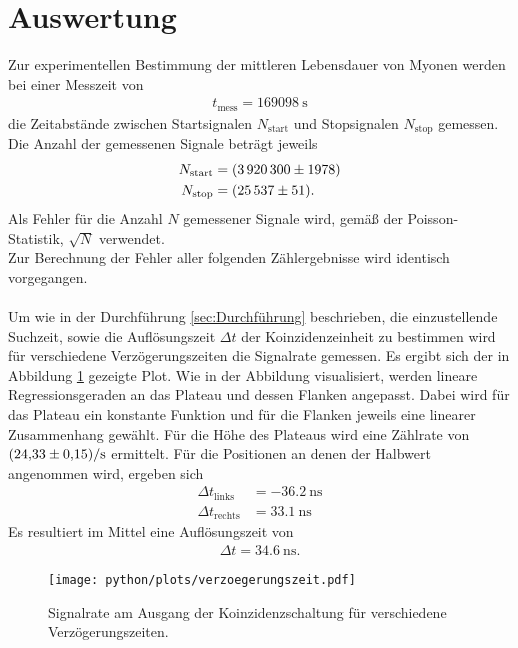 \section{Auswertung}
\label{sec:Auswertung}
Zur experimentellen Bestimmung der mittleren Lebensdauer von Myonen
werden bei einer Messzeit von
\begin{align*}
  t_\text{mess} = \SI{169098}{\second}
\end{align*}
die Zeitabstände zwischen Startsignalen $N_\text{start}$ und
Stopsignalen $N_\text{stop}$ gemessen.
Die Anzahl der gemessenen Signale beträgt jeweils
\begin{align*}
  N_\text{start} &= \SI{3920300+-1978}{}\\
  N_\text{stop} &= \SI{25537+-51}{} .
\end{align*}
Als Fehler für die Anzahl $N$ gemessener Signale wird, gemäß
der Poisson-Statistik, $\sqrt{N}$ verwendet.\\ Zur
Berechnung der Fehler aller folgenden Zählergebnisse
wird identisch vorgegangen.\\ \\

Um wie in der Durchführung \ref{sec:Durchführung} beschrieben, die einzustellende Suchzeit, sowie die Auflösungszeit $\Delta t$ der Koinzidenzeinheit zu bestimmen
wird für verschiedene Verzögerungszeiten die Signalrate gemessen. Es ergibt sich der in Abbildung \ref{fig:verzoegerungszeit} gezeigte Plot. Wie in der Abbildung visualisiert,
werden lineare Regressionsgeraden an das Plateau und dessen Flanken angepasst. Dabei wird für das Plateau ein konstante Funktion und für die Flanken jeweils eine linearer
Zusammenhang gewählt. Für die Höhe des Plateaus wird eine Zählrate von $\SI{24.33+-0.15}{\per\second}$ ermittelt.
Für die Positionen an denen der Halbwert angenommen wird, ergeben sich
\begin{align*}
  \Delta t_\text{links} &= \SI{-36.2}{\nano\second}\\
  \Delta t_\text{rechts} &= \SI{33.1}{\nano\second}
\end{align*}
Es resultiert im Mittel eine Auflösungszeit von
\begin{align*}
  \Delta t = \SI{34.6}{\nano\second} .
\end{align*}

\FloatBarrier
\begin{figure}
  \centering
  \texttt{[image: python/plots/verzoegerungszeit.pdf]}
  \caption{Signalrate am Ausgang der Koinzidenzschaltung für verschiedene Verzögerungszeiten.}
  \label{fig:verzoegerungszeit}
\end{figure}

